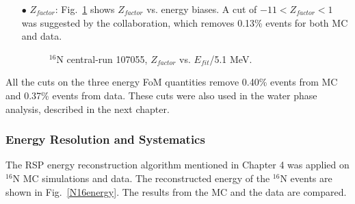 \begin{itemize}
	\item[$\bullet$]$Z_{factor}$:
	Fig.~\ref{energyFOM_Zfactor} shows $Z_{factor}$ vs. energy biases. A cut of $-11<Z_{factor}<1$ was suggested by the collaboration, which removes 0.13\% events for both MC and data.		
	\begin{figure}[!htb]
		\centering
		\caption{$^{16}$N central-run 107055, $Z_{factor}$ vs. $E_{fit}$/5.1 MeV.}
		\label{energyFOM_Zfactor}
	\end{figure}
	
	
\end{itemize}

All the cuts on the three energy FoM quantities remove 0.40\% events from MC and 0.37\% events from data. These cuts were also used in the water phase analysis, described in the next chapter.

\subsubsection{Energy Resolution and Systematics}
The RSP energy reconstruction algorithm mentioned in Chapter 4 was applied on $^{16}$N MC simulations and data. 
The reconstructed energy of the $^{16}$N events are shown in Fig.~\ref{N16energy}. The results from the MC and the data are compared.

